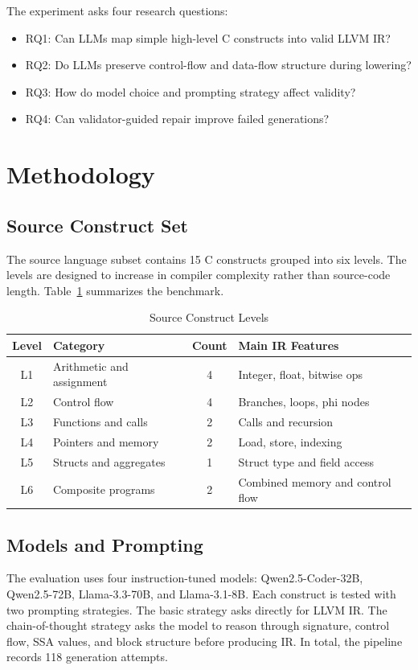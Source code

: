 \documentclass[conference]{IEEEtran}
\begin{document}
The experiment asks four research questions:

\begin{itemize}
\item RQ1: Can LLMs map simple high-level C constructs into valid LLVM IR?
\item RQ2: Do LLMs preserve control-flow and data-flow structure during lowering?
\item RQ3: How do model choice and prompting strategy affect validity?
\item RQ4: Can validator-guided repair improve failed generations?
\end{itemize}

\section{Methodology}
\subsection{Source Construct Set}
The source language subset contains 15 C constructs grouped into six levels. The levels are designed to increase in compiler complexity rather than source-code length. Table~\ref{tab:constructs} summarizes the benchmark.

\begin{table}[htbp]
\caption{Source Construct Levels}
\label{tab:constructs}
\centering
\begin{tabular}{@{}clcl@{}}
\toprule
Level & Category & Count & Main IR Features\\
\midrule
L1 & Arithmetic and assignment & 4 & Integer, float, bitwise ops\\
L2 & Control flow & 4 & Branches, loops, phi nodes\\
L3 & Functions and calls & 2 & Calls and recursion\\
L4 & Pointers and memory & 2 & Load, store, indexing\\
L5 & Structs and aggregates & 1 & Struct type and field access\\
L6 & Composite programs & 2 & Combined memory and control flow\\
\bottomrule
\end{tabular}
\end{table}

\subsection{Models and Prompting}
The evaluation uses four instruction-tuned models: Qwen2.5-Coder-32B, Qwen2.5-72B, Llama-3.3-70B, and Llama-3.1-8B. Each construct is tested with two prompting strategies. The basic strategy asks directly for LLVM IR. The chain-of-thought strategy asks the model to reason through signature, control flow, SSA values, and block structure before producing IR. In total, the pipeline records 118 generation attempts.
\end{document}
